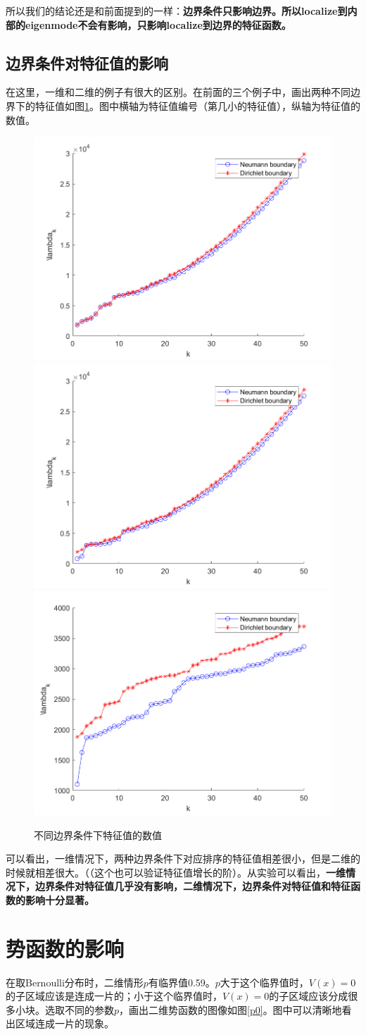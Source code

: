 \documentclass[12pt,a4paper]{article}
\begin{document}
所以我们的结论还是和前面提到的一样：\textbf{边界条件只影响边界。所以localize到内部的eigenmode不会有影响，只影响localize到边界的特征函数。}

\subsection{边界条件对特征值的影响}

在这里，一维和二维的例子有很大的区别。在前面的三个例子中，画出两种不同边界下的特征值如图\ref{be4}。图中横轴为特征值编号（第几小的特征值），纵轴为特征值的数值。

\begin{figure}[htbp]
\centering
\includegraphics[width=0.3\linewidth]{boundary/lam1}
\includegraphics[width=0.3\linewidth]{boundary/lam2}
\includegraphics[width=0.3\linewidth]{boundary/lam3}
\caption{不同边界条件下特征值的数值}
\label{be4}
\end{figure}

可以看出，一维情况下，两种边界条件下对应排序的特征值相差很小，但是二维的时候就相差很大。（（这个也可以验证特征值增长的阶）。从实验可以看出，\textbf{一维情况下，边界条件对特征值几乎没有影响，二维情况下，边界条件对特征值和特征函数的影响十分显著。}

\newpage

\section{势函数的影响}\label{potential}

在取Bernoulli分布时，二维情形$p$有临界值0.59。$p$大于这个临界值时，$V(x)=0$的子区域应该是连成一片的；小于这个临界值时，$V(x)=0$的子区域应该分成很多小块。选取不同的参数$p$，画出二维势函数的图像如图\ref{p0}。图中可以清晰地看出区域连成一片的现象。
\end{document}
